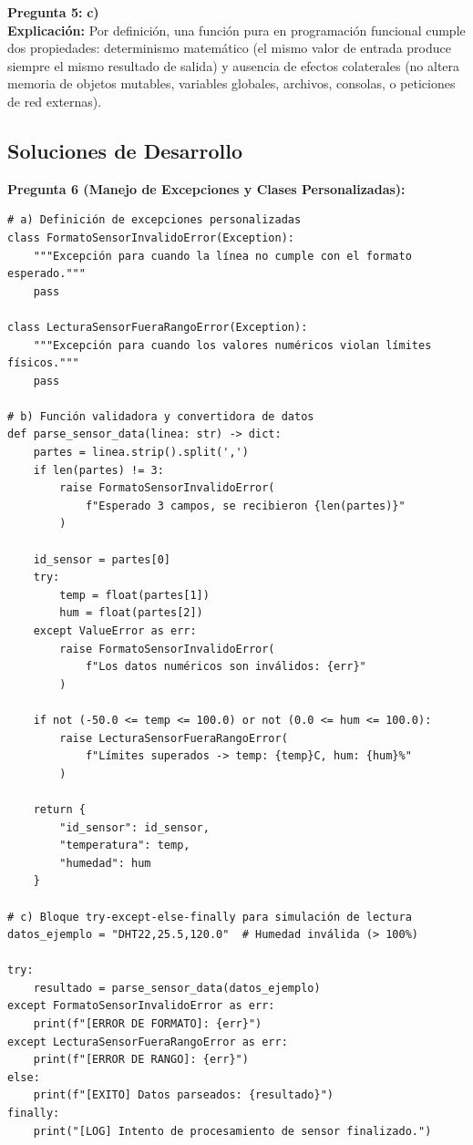 \documentclass[12pt,letterpaper]{article}
\begin{document}
\medskip

\textbf{Pregunta 5:} \textbf{c)} \\
\textbf{Explicación:} Por definición, una función pura en programación funcional cumple dos propiedades: determinismo matemático (el mismo valor de entrada produce siempre el mismo resultado de salida) y ausencia de efectos colaterales (no altera memoria de objetos mutables, variables globales, archivos, consolas, o peticiones de red externas).

\pagebreak

\subsection*{Soluciones de Desarrollo}

\textbf{Pregunta 6 (Manejo de Excepciones y Clases Personalizadas):}
\begin{verbatim}
# a) Definición de excepciones personalizadas
class FormatoSensorInvalidoError(Exception):
    """Excepción para cuando la línea no cumple con el formato esperado."""
    pass

class LecturaSensorFueraRangoError(Exception):
    """Excepción para cuando los valores numéricos violan límites físicos."""
    pass

# b) Función validadora y convertidora de datos
def parse_sensor_data(linea: str) -> dict:
    partes = linea.strip().split(',')
    if len(partes) != 3:
        raise FormatoSensorInvalidoError(
            f"Esperado 3 campos, se recibieron {len(partes)}"
        )
    
    id_sensor = partes[0]
    try:
        temp = float(partes[1])
        hum = float(partes[2])
    except ValueError as err:
        raise FormatoSensorInvalidoError(
            f"Los datos numéricos son inválidos: {err}"
        )
    
    if not (-50.0 <= temp <= 100.0) or not (0.0 <= hum <= 100.0):
        raise LecturaSensorFueraRangoError(
            f"Límites superados -> temp: {temp}C, hum: {hum}%"
        )
    
    return {
        "id_sensor": id_sensor,
        "temperatura": temp,
        "humedad": hum
    }

# c) Bloque try-except-else-finally para simulación de lectura
datos_ejemplo = "DHT22,25.5,120.0"  # Humedad inválida (> 100%)

try:
    resultado = parse_sensor_data(datos_ejemplo)
except FormatoSensorInvalidoError as err:
    print(f"[ERROR DE FORMATO]: {err}")
except LecturaSensorFueraRangoError as err:
    print(f"[ERROR DE RANGO]: {err}")
else:
    print(f"[EXITO] Datos parseados: {resultado}")
finally:
    print("[LOG] Intento de procesamiento de sensor finalizado.")
\end{verbatim}
\end{document}
